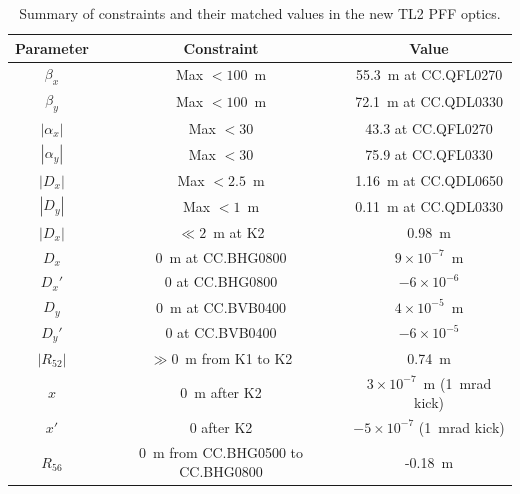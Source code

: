 \begin{table}
  \begin{center}
    \begin{tabular}{|c c c|}
	   \hline
       Parameter & Constraint & Value \\ \hline
       \(\beta_x\) & Max \(<100\)~m & 55.3~m at CC.QFL0270\\
	   \(\beta_y\) & Max \(<100\)~m & 72.1~m at CC.QDL0330\\
	   \(|\alpha_x|\) & Max \(<30\) & 43.3 at CC.QFL0270\\
	   \(|\alpha_y|\) & Max \(<30\) & 75.9 at CC.QFL0330\\
	   \(|D_x|\) & Max \(<2.5\)~m & 1.16~m at CC.QDL0650\\
	   \(|D_y|\) & Max \(<1\)~m & 0.11~m at CC.QDL0330\\
	   \(|D_x|\) & \(\ll 2\)~m at K2 & 0.98~m\\
	   \(D_x\) & 0~m at CC.BHG0800 & \(9\times10^{-7}\)~m\\
	   \(D_x'\) & 0 at CC.BHG0800 & \(-6\times10^{-6}\)\\
	   \(D_y\) & 0~m at CC.BVB0400 & \(4\times10^{-5}\)~m\\
	   \(D_y'\) & 0 at CC.BVB0400 & \(-6\times10^{-5}\)\\
	   \(|R_{52}|\) & \(\gg 0\)~m from K1 to K2 & 0.74~m\\
	   \(x\) & 0~m after K2 & \(3\times10^{-7}\)~m (1~mrad kick)\\
	   \(x'\) & 0 after K2 & \(-5\times10^{-7}\) (1~mrad kick)\\
	   \(R_{56}\) & 0~m from CC.BHG0500 to CC.BHG0800 & -0.18~m\\
	   \hline
    \end{tabular}
    \caption{Summary of constraints and their matched values in the new TL2 PFF optics.}
  	\label{t:pffOpticsVals}
  \end{center}
\end{table}


